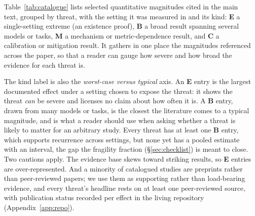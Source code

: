 \documentclass[11pt]{article}
\begin{document}
Table~\ref{tab:catalogue} lists selected quantitative magnitudes cited in the main
text, grouped by threat, with the setting it was measured in and its kind:
\textbf{E} a single-setting extreme (an existence proof), \textbf{B} a broad
result spanning several models or tasks, \textbf{M} a mechanism or
metric-dependence result, and \textbf{C} a calibration or mitigation result.
It gathers in one place the magnitudes referenced across the paper, so that a
reader can gauge how severe and how broad the evidence for each threat is.

The kind label is also the \emph{worst-case versus typical} axis. An \textbf{E}
entry is the largest documented effect under a setting chosen to expose the
threat: it shows the threat \emph{can} be severe and licenses no claim about how
often it is. A \textbf{B} entry, drawn from many models or tasks, is the closest
the literature comes to a typical magnitude, and is what a reader should use
when asking whether a threat is likely to matter for an arbitrary study. Every
threat has at least one \textbf{B} entry, which supports recurrence across
settings, but none yet has a pooled estimate with an interval, the gap the fragility
fraction (\S\ref{sec:checklist}) is meant to close. Two cautions apply. The
evidence base skews toward striking results, so \textbf{E} entries are
over-represented. And a minority of catalogued studies are preprints rather than
peer-reviewed papers; we use them as supporting rather than load-bearing
evidence, and every threat's headline rests on at least one peer-reviewed
source, with publication status recorded per effect in the living repository
(Appendix~\ref{app:repo}).
\end{document}
